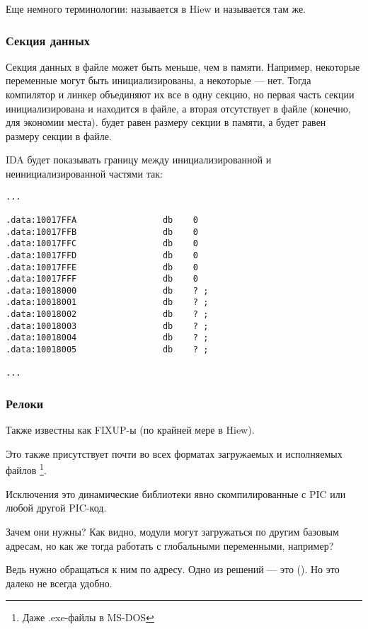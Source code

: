 Еще немного терминологии:  называется  в Hiew и  называется  там же.

\subsubsection{Секция данных}

Секция данных в файле может быть меньше, чем в памяти.
Например, некоторые переменные могут быть инициализированы, а некоторые --- нет.
Тогда компилятор и линкер объединяют их все в одну секцию, но первая часть секции инициализирована и находится в файле,
а вторая отсутствует в файле (конечно, для экономии места).
 будет равен размеру секции в памяти, а  будет равен размеру секции в файле.

IDA будет показывать границу между инициализированной и неинициализированной частями так:

\begin{lstlisting}
...

.data:10017FFA                 db    0
.data:10017FFB                 db    0
.data:10017FFC                 db    0
.data:10017FFD                 db    0
.data:10017FFE                 db    0
.data:10017FFF                 db    0
.data:10018000                 db    ? ;
.data:10018001                 db    ? ;
.data:10018002                 db    ? ;
.data:10018003                 db    ? ;
.data:10018004                 db    ? ;
.data:10018005                 db    ? ;

...
\end{lstlisting}

\subsubsection{Релоки}
\label{subsec:relocs}

Также известны как FIXUP-ы (по крайней мере в Hiew).

Это также присутствует почти во всех форматах загружаемых и исполняемых файлов
\footnote{Даже .exe-файлы в MS-DOS}.

Исключения это динамические библиотеки явно скомпилированные с \ac{PIC} или любой другой \ac{PIC}-код.

Зачем они нужны?
Как видно, модули могут загружаться по другим базовым адресам,
но как же тогда работать с глобальными переменными, например?

Ведь нужно обращаться к ним по адресу.
Одно из решений --- это \PICcode{} ().  Но это далеко не всегда удобно.

